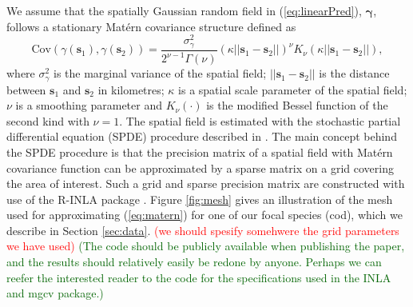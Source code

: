 \documentclass[a4paper 12pt]{article}
\numberwithin{equation}{section}
\newcommand{\ed}[1]{\textcolor{red}{#1}}
\newcommand{\olav}[1]{\textcolor{darkgreen}{#1}}
\begin{document}
We assume that the spatially Gaussian random field in (\ref{eq:linearPred}), $\pmb{\gamma}$, follows a stationary Mat\'{e}rn covariance structure defined as
\begin{equation}\label{eq:matern}
 \text{Cov}(\gamma(\mathbf{s}_1),\gamma(\mathbf{s}_2)) = \frac{\sigma^2_{\gamma}}{2^{\nu-1}\Gamma(\nu)}(\kappa||\mathbf{s}_1 -\mathbf{s}_2||)^{\nu}K_{\nu}(\kappa||\mathbf{s}_1-\mathbf{s}_2||),
\end{equation}
where $\sigma^2_{\gamma}$ is the marginal variance of the spatial field; $||\mathbf{s}_1-\mathbf{s}_2||$ is the distance between $\mathbf{s}_1$ and $\mathbf{s}_2$ in kilometres; $\kappa$ is a spatial scale parameter of the spatial field; $\nu$ is a smoothing parameter and $K_{\nu}(\cdot)$ is the modified Bessel function of the second kind with $\nu = 1$.  The spatial field is estimated with the stochastic partial differential equation (SPDE) procedure described in \citet{lindgren2011explicit}. The main concept behind the SPDE procedure is that the precision matrix of a spatial field with Mat\'{e}rn  covariance function can be approximated by a sparse matrix on a grid covering the area of interest. Such a grid and sparse precision matrix are constructed with use of the R-INLA package \citep{rue2009approximate}. Figure \ref{fig:mesh} gives an illustration of the mesh used for approximating  (\ref{eq:matern}) for one of our focal species (cod), which we describe in Section \ref{sec:data}. \ed{(we should spesify somehwere the grid parameters we have used)} \olav{(The code should be publicly available when publishing the paper, and the results should relatively easily be redone by anyone. Perhaps we can reefer the interested reader to the code for the specifications used in the INLA and mgcv package.)}

%
\end{document}

